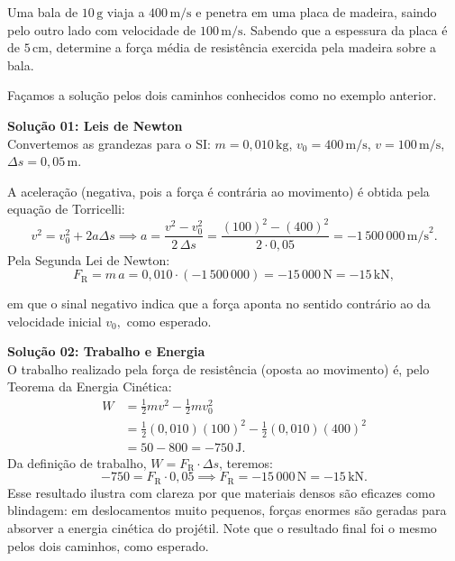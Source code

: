 \vspace{0.3cm}





\begin{exemplo}[Nível II]\label{exemplo_energia_teoremaenergiacinetica02}

Uma bala de $10\,\text{g}$ viaja a $400\,\text{m/s}$ e penetra em uma placa
de madeira, saindo pelo outro lado com velocidade de $100\,\text{m/s}$.
Sabendo que a espessura da placa é de $5\,\text{cm}$, determine a força
média de resistência exercida pela madeira sobre a bala.


\resolucao

Façamos a solução pelos dois caminhos conhecidos como no exemplo anterior.

\bigskip

\textbf{Solução 01: Leis de Newton} \\

Convertemos as grandezas para o SI\@: $m = 0{,}010\,\text{kg}$,
$v_0 = 400\,\text{m/s}$, $v = 100\,\text{m/s}$, $\Delta s = 0{,}05\,\text{m}$.

A aceleração (negativa, pois a força é contrária ao movimento) é obtida
pela equação de Torricelli:
%
\begin{equation*}
    v^2 = v_0^2 + 2a\Delta s
    \implies a = \frac{v^2 - v_0^2}{2\,\Delta s}
    = \frac{(100)^2 - (400)^2}{2 \cdot 0{,}05}
    = -1\,500\,000\,\text{m/s}^2.
\end{equation*}
%
Pela Segunda Lei de Newton:
%
\begin{equation*}
    F_\text{R} = m\,a = 0{,}010 \cdot (-1\,500\,000)
    = \boxed{-15\,000\,\text{N} = -15\,\text{kN},}
\end{equation*}

\noindent em que o sinal negativo indica que a força aponta no sentido contrário ao da velocidade inicial $v_0,$ como esperado.



\bigskip
\textbf{Solução 02: Trabalho e Energia} \\

O trabalho realizado pela força de resistência (oposta ao movimento) é, pelo Teorema da Energia Cinética:
%
\begin{align*}
    W &= \frac{1}{2}mv^2 - \frac{1}{2}mv_0^2 \\[4pt]
               &= \frac{1}{2}(0{,}010)(100)^2
                  - \frac{1}{2}(0{,}010)(400)^2 \\[4pt]
               &= 50 - 800 = -750\,\text{J}.
\end{align*}
%
Da definição de trabalho, $W = F_\text{R}\cdot\Delta s$, teremos:
%
\begin{equation*}
    -750 = F_\text{R} \cdot 0{,}05
    \implies \boxed{F_\text{R} = -15\,000\,\text{N} = -15\,\text{kN}.}
\end{equation*}
%
Esse resultado ilustra com clareza por que materiais densos são eficazes
como blindagem: em deslocamentos muito pequenos, forças enormes são geradas
para absorver a energia cinética do projétil. Note que o resultado final foi o mesmo pelos dois caminhos, como esperado.


\end{exemplo}


